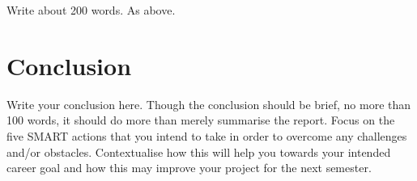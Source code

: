 \documentclass{scrartcl}
\begin{document}
Write about 200 words. As above.

\section{Conclusion}

Write your conclusion here. Though the conclusion should be brief, no more than 100 words, it should do more than merely summarise the report. Focus on the five SMART actions that you intend to take in order to overcome any challenges and/or obstacles. Contextualise how this will help you towards your intended career goal and how this may improve your project for the next semester.



\end{document}
